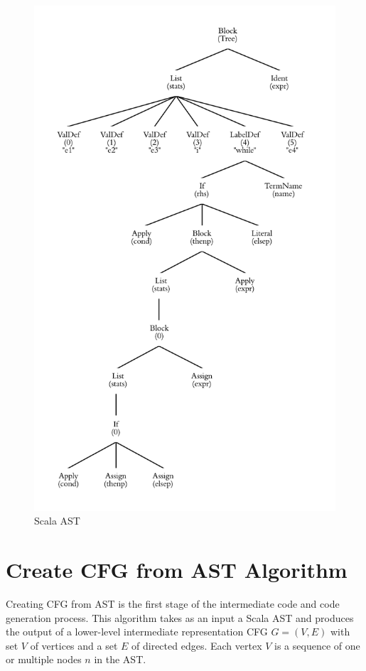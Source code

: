 \begin{figure}[h!]
\centering
\includegraphics[width=0.8\linewidth]{figures/Tree}
\caption{Scala AST}
\label{fig:Tree}
\end{figure}

\section{Create CFG from AST Algorithm}
Creating CFG from AST is the first stage of the intermediate code and code generation process. This algorithm takes as an input a Scala AST and produces the output of a lower-level intermediate representation CFG $G=(V,E)$ with set $V$ of vertices and a set $E$ of directed edges. Each vertex $V$ is a sequence of one or multiple nodes $n$ in the AST. 

